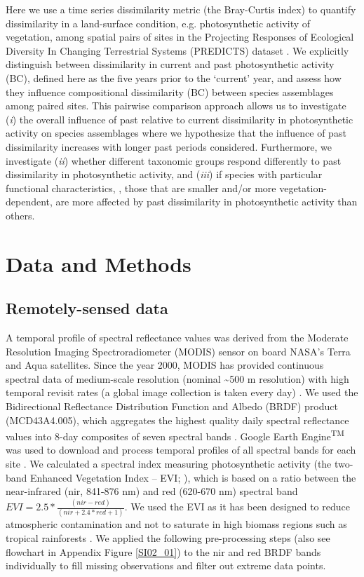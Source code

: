 Here we use a time series dissimilarity metric (the Bray-Curtis index) to quantify dissimilarity in a land-surface condition, e.g. photosynthetic activity of vegetation, among spatial pairs of sites in the Projecting Responses of Ecological Diversity In Changing Terrestrial Systems (PREDICTS) dataset \citep{Hudson2016}. We explicitly distinguish between dissimilarity in current and past photosynthetic activity (BC), defined here as the five years prior to the ‘current’ year, and assess how they influence compositional dissimilarity (BC) between species assemblages among paired sites. This pairwise comparison approach allows us to investigate (\textit{i}) the overall influence of past relative to current dissimilarity in photosynthetic activity on species assemblages where we hypothesize that the influence of past dissimilarity increases with longer past periods considered. Furthermore, we investigate (\textit{ii}) whether different taxonomic groups respond differently to past dissimilarity in photosynthetic activity, and (\textit{iii}) if species with particular functional characteristics, \ie, those that are smaller and/or more vegetation-dependent, are more affected by past dissimilarity in photosynthetic activity than others. 

\section{Data and Methods}
\label{C02_02}
\subsection{Remotely-sensed data}
\label{C02_0201}
A temporal profile of spectral reflectance values was derived from the Moderate Resolution Imaging Spectroradiometer (MODIS) sensor on board NASA’s Terra and Aqua satellites. Since the year 2000, MODIS has provided continuous spectral data of medium-scale resolution (nominal \textasciitilde 500 m resolution) with high temporal revisit rates (a global image collection is taken every day) \citep{Schaaf2002}. We used the Bidirectional Reflectance Distribution Function and Albedo (BRDF) product (MCD43A4.005), which aggregates the highest quality daily spectral reflectance values into 8-day composites of seven spectral bands \citep{Schaaf2002}. Google Earth Engine\textsuperscript{TM} was used to download and process temporal profiles of all spectral bands for each site \citep{Gorelick2017}. We calculated a spectral index measuring photosynthetic activity (the two-band Enhanced Vegetation Index – EVI; \cite{Jiang2008}), which is based on a ratio between the near-infrared (nir, 841-876 nm) and red (620-670 nm) spectral band \( EVI = 2.5 * \frac{(nir - red)}{(nir + 2.4 * red + 1)} \). We used the EVI as it has been designed to reduce atmospheric contamination and not to saturate in high biomass regions such as tropical rainforests \citep{Huete2002,Jiang2008}. We applied the following pre-processing steps (also see flowchart in Appendix Figure \ref{SI02_01}) to the nir and red BRDF bands individually to fill missing observations and filter out extreme data points. 

